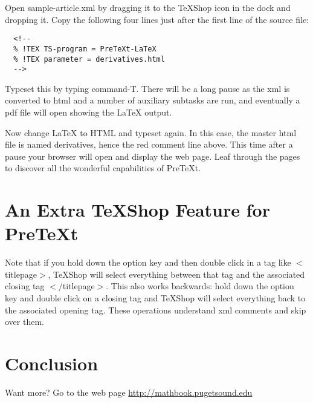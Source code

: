 \documentclass[11pt, oneside]{article}   	%
\begin{document}
Open sample-article.xml by dragging it to the TeXShop icon in the dock and dropping it. Copy the following four lines just after the first line of the source file:
\begin{verbatim}
  <!--
  % !TEX TS-program = PreTeXt-LaTeX
  % !TEX parameter = derivatives.html
  -->
\end{verbatim}

Typeset this by typing command-T. There will be a long pause as the xml is converted to html and a number of auxiliary subtasks are run, and eventually a pdf file will open showing the LaTeX output.

Now change LaTeX to HTML and typeset again. In this case, the master html file is named derivatives, hence the red comment line above. This time after a pause your browser will open and display the web page. Leaf through the pages to discover all the wonderful capabilities of PreTeXt.

\section{An Extra TeXShop Feature for PreTeXt}

Note that if you hold down the option key and then double click in a tag like $<$titlepage$>$, TeXShop will select everything between that tag and the associated closing tag $</$titlepage$>$. This also works backwards: hold down the option key and double click on a closing tag and TeXShop will select everything back to the associated opening tag. These operations understand xml comments and skip over them.

\section{Conclusion}


Want more? Go to the web page \url{http://mathbook.pugetsound.edu}

	
\end{document}
